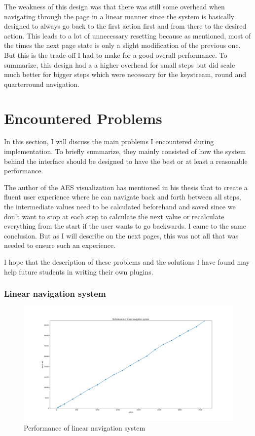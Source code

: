 The weakness of this design was that there was still some overhead when navigating through the page in a linear manner since the system is basically designed to always go back to the first action first and from there to the desired action. This leads to a lot of unnecessary resetting because as mentioned, most of the times the next page state is only a slight modification of the previous one. But this is the trade-off I had to make for a good overall performance. To summarize, this design had a a higher overhead for small steps but did scale much better for bigger steps which were necessary for the keystream, round and quarterround navigation. 


\section{Encountered Problems}
\label{sec:encounteredProblems}

In this section, I will discuss the main problems I encountered during implementation. To briefly summarize, they mainly consisted of how the system behind the interface should be designed to have the best or at least a reasonable performance.

The author of the AES visualization has mentioned in his thesis that to create a fluent user experience where he can navigate back and forth between all steps, the intermediate values need to be calculated beforehand and saved since we don't want to stop at each step to calculate the next value or recalculate everything from the start if the user wants to go backwards. I came to the same conclusion. But as I will describe on the next pages, this was not all that was needed to ensure such an experience.

I hope that the description of these problems and the solutions I have found may help future students in writing their own plugins.

\subsubsection{Linear navigation system}

\begin{figure}
\centering
\includegraphics[width=\textwidth]{figures/pyplot/performance_navsystem-linear.png}
\caption{Performance of linear navigation system}
\label{fig:navsystem.performance.linear}
\end{figure}


